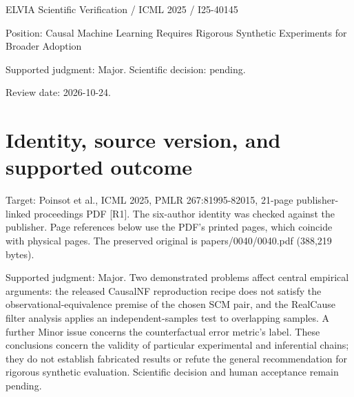 \documentclass[10pt]{article}
\begin{document}
ELVIA Scientific Verification / ICML 2025 / I25-40145\par
Position: Causal Machine Learning Requires Rigorous Synthetic Experiments for Broader Adoption\par
Supported judgment: Major. Scientific decision: pending.\par
Review date: 2026-10-24.\par
\section*{Identity, source version, and supported outcome}
Target: Poinsot et al., ICML 2025, PMLR 267:81995-82015, 21-page publisher-linked proceedings PDF [R1]. The six-author identity was checked against the publisher. Page references below use the PDF’s printed pages, which coincide with physical pages. The preserved original is papers/0040/0040.pdf (388,219 bytes).\par
Supported judgment: Major. Two demonstrated problems affect central empirical arguments: the released CausalNF reproduction recipe does not satisfy the observational-equivalence premise of the chosen SCM pair, and the RealCause filter analysis applies an independent-samples test to overlapping samples. A further Minor issue concerns the counterfactual error metric’s label. These conclusions concern the validity of particular experimental and inferential chains; they do not establish fabricated results or refute the general recommendation for rigorous synthetic evaluation. Scientific decision and human acceptance remain pending.\par
\end{document}
